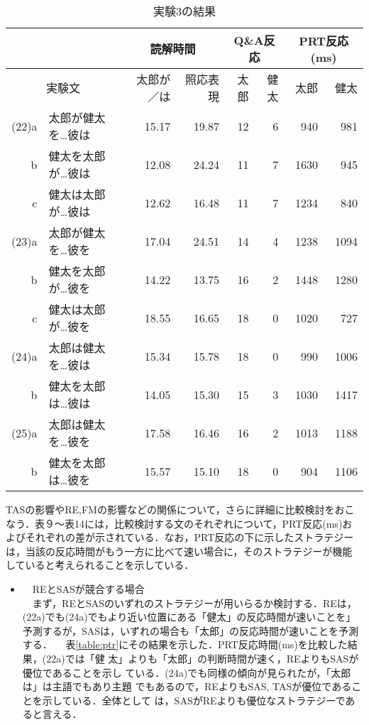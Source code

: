 \begin{table}
\vspace{-6mm}
\begin{center}
\caption{実験3の結果}
\label{table:exam3r}
\begin{tabular}{|rl|r|r|r|r|r|r|} \hline
 \multicolumn{2}{|c|}{}&
 \multicolumn{2}{c|}{読解時間} &
 \multicolumn{2}{c|}{Q\&A反応} &
 \multicolumn{2}{c|}{PRT反応(ms)} \\ \hline
 \multicolumn{2}{|c|}{実験文} & 
  太郎が／は & 照応表現 & 太郎 & 健太 & 太郎 & 健太 \\ \hline
(22)a & 太郎が健太を\ldots 彼は & 15.17 & 19.87 & 12	& 6 & 940 & 981\\
    b & 健太を太郎が\ldots 彼は & 12.08 & 24.24 & 11	& 7 & 1630 & 945\\
    c & 健太は太郎が\ldots 彼は & 12.62 & 16.48 & 11	& 7 & 1234 & 840\\
(23)a & 太郎が健太を\ldots 彼を & 17.04 & 24.51 & 14	& 4 & 1238 & 1094\\
    b & 健太を太郎が\ldots 彼を & 14.22 & 13.75 & 16	& 2 & 1448 & 1280\\
    c & 健太は太郎が\ldots 彼を & 18.55 & 16.65 & 18	& 0 & 1020 & 727\\
(24)a & 太郎は健太を\ldots 彼は & 15.34 & 15.78 & 18	& 0 & 990 & 1006\\
    b &	健太を太郎は\ldots 彼は & 14.05 & 15.30 & 15	& 3 & 1030 & 1417\\
(25)a & 太郎は健太を\ldots 彼を & 17.58 & 16.46 & 16	& 2 & 1013 & 1188\\
    b & 健太を太郎は\ldots 彼を & 15.57 & 15.10 & 18	& 0 & 904 & 1106\\ \hline
\end{tabular}
\end{center}


\end{table}

\vspace{0.5cm}

 TASの影響やRE,FMの影響などの関係について，さらに詳細に比較検討をおこ
なう．表９〜表14には，比較検討する文のそれぞれについて，PRT反応(ms)お
よびそれぞれの差が示されている．なお，PRT反応の下に示したストラテジー
は，当該の反応時間がもう一方に比べて速い場合に，そのストラテジーが機能
していると考えられることを示している．

\vspace{-0.3cm}

\begin{itemize}
  \item　REとSASが競合する場合\\
　まず，REとSASのいずれのストラテジーが用いらるか検討する．REは，(22a)でも(24a)でもより近い位置にある「健太」の反応時間が速いことを」予測するが，SASは，いずれの場合も「太郎」の反応時間が速いことを予測する．
　表\ref{table:ptr}にその結果を示した．PRT反応時間(ms)を比較した結果，(22a)では「健
太」よりも「太郎」の判断時間が速く，REよりもSASが優位であることを示し
ている．(24a)でも同様の傾向が見られたが，「太郎は」は主語でもあり主題
でもあるので，REよりもSAS, TASが優位であることを示している．全体として
は，SASがREよりも優位なストラテジーであると言える．
\end{itemize}

